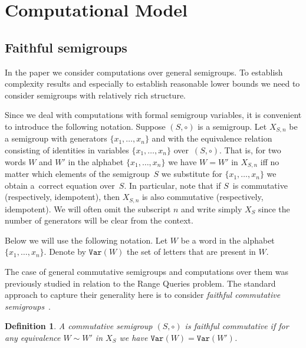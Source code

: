 \documentclass[11pt,letterpaper]{article}
\newtheorem{definition}{Definition}
\newcommand{\var}{\texttt{Var}}
\begin{document}
\section{Computational Model}


\subsection{Faithful semigroups}

In the paper we consider computations over general semigroups. To establish
complexity results and especially to establish reasonable lower bounds we need
to consider semigroups with relatively rich structure.

Since we deal with computations with formal semigroup variables, it is
convenient to introduce the following notation. Suppose $(S, \circ)$ is a
semigroup. Let $X_{S,n}$ be a semigroup with generators $\{x_1,\ldots, x_n\}$
and with the equivalence relation consisting of identities in variables
$\{x_1,\ldots, x_n\}$ over~$(S,\circ)$. That is, for two words $W$ and $W'$ in
the alphabet $\{x_1,\ldots,x_n\}$ we have $W=W'$ in $X_{S,n}$ iff no matter which
elements of the semigroup~$S$ we substitute for $\{x_1,\ldots, x_n\}$ we obtain
a~correct equation over~$S$. In particular, note that if $S$~is commutative
(respectively, idempotent), then $X_{S,n}$ is also commutative (respectively,
idempotent). We will often omit the subscript $n$ and write simply $X_S$ since the number of generators will be clear from the context.

Below we will use the following notation. Let $W$ be a word in the alphabet
$\{x_1,\ldots, x_n\}$. Denote by $\var(W)$ the set of letters that are present
in $W$.

The case of general commutative semigroups and computations over them was
previously studied in relation to the Range Queries problem. The standard
approach to capture their generality here is to consider \emph{faithful
commutative semigroups}~\cite{DBLP:conf/stoc/Yao82,DBLP:journals/ijcga/ChazelleR91}.

\begin{definition}
A commutative semigroup $(S, \circ)$ is \emph{faithful commutative} if for any
equivalence $W\sim W'$ in $X_S$ we have $\var(W)=\var(W')$.
\end{definition}
\end{document}
